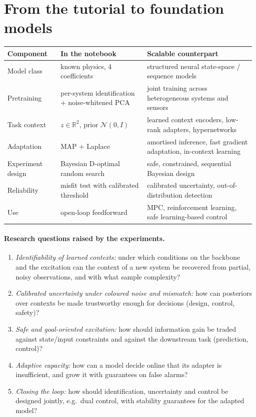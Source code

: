\documentclass[11pt,a4paper]{article}
\newcommand{\R}{\mathbb{R}}
\newcommand{\N}{\mathcal{N}}
\begin{document}
\section{From the tutorial to foundation models}\label{sec:outlook}

\begin{table}[h]
  \centering\small
  \begin{tabularx}{\linewidth}{l X X}
    \toprule
    Component & In the notebook & Scalable counterpart\\
    \midrule
    Model class & known physics, 4 coefficients & structured neural state-space / sequence models\\
    Pretraining & per-system identification + noise-whitened PCA & joint training across heterogeneous systems and sensors\\
    Task context & $z\in\R^2$, prior $\N(0,I)$ & learned context encoders, low-rank adapters, hypernetworks\\
    Adaptation & MAP + Laplace & amortised inference, fast gradient adaptation, in-context learning\\
    Experiment design & Bayesian D-optimal random search & safe, constrained, sequential Bayesian design\\
    Reliability & misfit test with calibrated threshold & calibrated uncertainty, out-of-distribution detection\\
    Use & open-loop feedforward & MPC, reinforcement learning, safe learning-based control\\
    \bottomrule
  \end{tabularx}
\end{table}

\paragraph{Research questions raised by the experiments.}
\begin{enumerate}
  \item \emph{Identifiability of learned contexts:} under which conditions on the backbone and the
        excitation can the context of a new system be recovered from partial, noisy observations, and
        with what sample complexity?
  \item \emph{Calibrated uncertainty under coloured noise and mismatch:} how can posteriors over
        contexts be made trustworthy enough for decisions (design, control, safety)?
  \item \emph{Safe and goal-oriented excitation:} how should information gain be traded against
        state/input constraints and against the downstream task (prediction, control)?
  \item \emph{Adaptive capacity:} how can a model decide online that its adapter is insufficient,
        and grow it with guarantees on false alarms?
  \item \emph{Closing the loop:} how should identification, uncertainty and control be designed
        jointly, e.g.\ dual control, with stability guarantees for the adapted model?
\end{enumerate}
\end{document}
